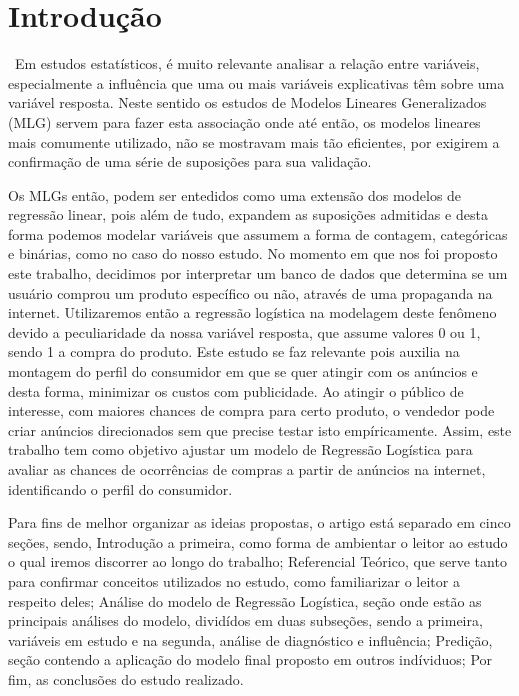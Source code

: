 \documentclass[a4paper]{article}
\begin{document}
\bigskip
\hline



\section{ Introdução}

\quad\ Em estudos estatísticos, é muito relevante analisar a relação entre variáveis, especialmente a influência que uma ou mais variáveis explicativas têm sobre uma variável resposta. Neste sentido os estudos de Modelos Lineares Generalizados (MLG) servem para fazer esta associação onde até então, os modelos lineares mais comumente utilizado, não se mostravam mais tão eficientes, por exigirem a confirmação de uma série de suposições para sua validação.

Os MLGs então, podem ser entedidos como uma extensão dos modelos de regressão linear, pois além de tudo, expandem as suposições admitidas e desta forma podemos modelar variáveis que assumem a forma de contagem, categóricas e binárias, como no caso do nosso estudo. No momento em que nos foi proposto este trabalho, decidimos por interpretar um banco de dados que determina se um usuário comprou um produto específico ou não, através de uma propaganda na internet. Utilizaremos então a regressão logística na modelagem deste fenômeno devido a peculiaridade da nossa variável resposta, que assume valores 0 ou 1, sendo 1 a compra do produto. Este estudo se faz relevante pois auxilia na montagem do perfil do consumidor em que se quer atingir com os anúncios e desta forma, minimizar os custos com publicidade. Ao atingir o público de interesse, com maiores chances de compra para certo produto, o vendedor pode criar anúncios direcionados sem que precise testar isto empíricamente. Assim, este trabalho tem como objetivo ajustar um modelo de Regressão Logística para avaliar as chances de ocorrências de compras a partir de anúncios na internet, identificando o perfil do consumidor.

Para fins de melhor organizar as ideias propostas, o artigo está separado em cinco seções, sendo, Introdução a primeira, como forma de ambientar o leitor ao estudo o qual iremos discorrer ao longo do trabalho; Referencial Teórico, que serve tanto para confirmar conceitos utilizados no estudo, como familiarizar o leitor a respeito deles; Análise do modelo de Regressão Logística, seção onde estão as principais análises do modelo, dividídos em duas subseções, sendo a primeira, variáveis em estudo e na segunda, análise de diagnóstico e influência; Predição, seção contendo a aplicação do modelo final proposto em outros indíviduos; Por fim, as conclusões do estudo realizado.
\end{document}
